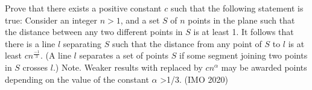 %
%
%
%
%
%
\iffalse
\item Prove that there exists a positive constant $c$ such that the following statement is true:
Consider an integer $n> 1$, and a set $S$ of $n$ points in the plane such that the distance between
any
 two different points in $S$ is at least 1. It follows that there is a 
line $l$ separating $S$ such that the distance from any point of $S$ to $l$ is 
at least $cn^\frac{-1}{3}$.
(A line $l$ separates a set of points $S$ if some segment joining two points in $S$ crosses $l$.)
Note. Weaker results with  replaced by $cn^\alpha$ may be awarded points depending on the value of the constant $ \alpha$ \textgreater1/3.
   \hfill(IMO 2020)
